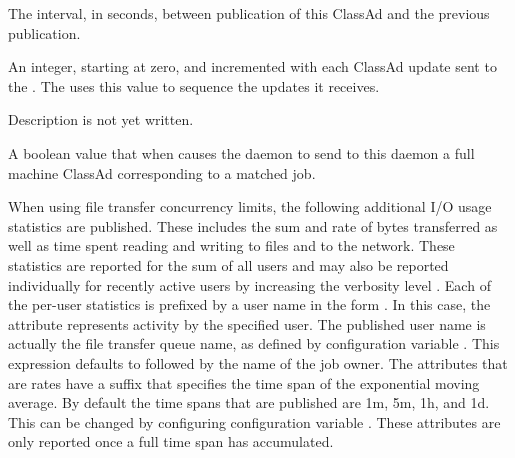 \begin{description}
\item[\AdAttr{UpdateInterval}:] The interval, in seconds,
  between publication of this  ClassAd and
  the previous publication.

\item[\AdAttr{UpdateSequenceNumber}:] An integer, starting at zero,
  and incremented with each ClassAd update sent to the .
  The  uses this value to sequence the updates it
  receives.

\item[\AdAttr{VirtualMemory}:] Description is not yet written.

\item[\AdAttr{WantResAd}:] A boolean value that when 
  causes the  daemon to send to this 
  daemon a full machine ClassAd corresponding to a matched job.

\end{description}

\label{sec:FT-Scheduler-ClassAd-Attributes}
When using file transfer concurrency limits, 
the following additional I/O usage statistics are published.
These includes the sum and rate of bytes
transferred as well as time spent reading and writing to files and
to the network.  These statistics are reported for the sum of all
users and may also be reported individually for recently active users
by increasing the verbosity level .
Each of the per-user statistics is prefixed by a
user name in the form .
In this case, the attribute represents activity by the specified user.
The published user name is actually the file transfer queue name, 
as defined by configuration variable .
This expression defaults to  followed by the name of the job
owner.
The attributes that are rates have a
suffix that specifies the time span of the exponential moving average.
By default the time spans that are published are 1m, 5m, 1h, and 1d.
This can be changed by configuring configuration variable
.  These attributes are only
reported once a full time span has accumulated.

